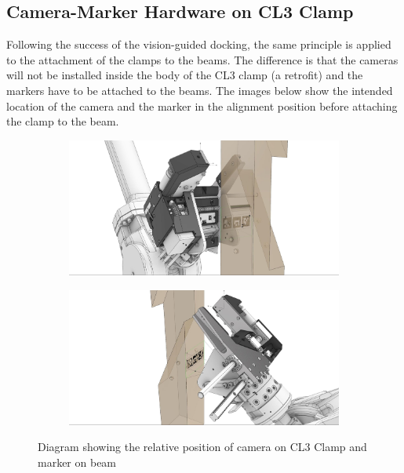 \subsection{Camera-Marker Hardware on CL3 Clamp}
\label{subsection:exploration-5-camera-marker-hardware-on-cl3-clamp}

Following the success of the vision-guided docking, the same principle is applied to the attachment of the clamps to the beams. The difference is that the cameras will not be installed inside the body of the CL3 clamp (a retrofit) and the markers have to be attached to the beams. The images below show the intended location of the camera and the marker in the alignment position before attaching the clamp to the beam.

\begin{figure}[!h]
    \centering
    \begin{subfigure}[b]{0.49\textwidth}
        \centering
        \includegraphics[width=\textwidth]{images/08/img12.jpg}
    \end{subfigure}
    \hfill
    \begin{subfigure}[b]{0.49\textwidth}
        \centering
        \includegraphics[width=\textwidth]{images/08/img13.jpg}
    \end{subfigure}
    \caption{Diagram showing the relative position of camera on CL3 Clamp and marker on beam}
\end{figure}


